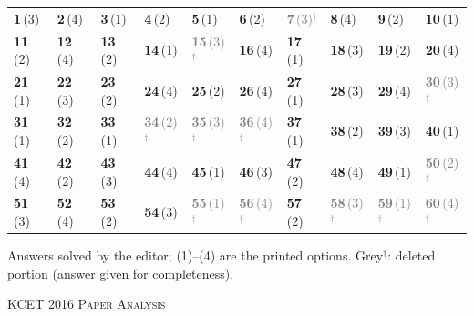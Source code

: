 {\small\setlength{\tabcolsep}{1pt}\renewcommand{\arraystretch}{1.5}
\begin{tabularx}{\linewidth}{@{}*{10}{>{\centering\arraybackslash}X}@{}}\toprule
\textbf{1}\,(3) & \textbf{2}\,(4) & \textbf{3}\,(1) & \textbf{4}\,(2) & \textbf{5}\,(1) & \textbf{6}\,(2) & \textcolor{gray}{\textbf{7}\,(3)$^{\dagger}$} & \textbf{8}\,(4) & \textbf{9}\,(2) & \textbf{10}\,(1)\\
\textbf{11}\,(2) & \textbf{12}\,(4) & \textbf{13}\,(2) & \textbf{14}\,(1) & \textcolor{gray}{\textbf{15}\,(3)$^{\dagger}$} & \textbf{16}\,(4) & \textbf{17}\,(1) & \textbf{18}\,(3) & \textbf{19}\,(2) & \textbf{20}\,(4)\\
\textbf{21}\,(1) & \textbf{22}\,(3) & \textbf{23}\,(2) & \textbf{24}\,(4) & \textbf{25}\,(2) & \textbf{26}\,(4) & \textbf{27}\,(1) & \textbf{28}\,(3) & \textbf{29}\,(4) & \textcolor{gray}{\textbf{30}\,(3)$^{\dagger}$}\\
\textbf{31}\,(1) & \textbf{32}\,(2) & \textbf{33}\,(1) & \textcolor{gray}{\textbf{34}\,(2)$^{\dagger}$} & \textcolor{gray}{\textbf{35}\,(3)$^{\dagger}$} & \textcolor{gray}{\textbf{36}\,(4)$^{\dagger}$} & \textbf{37}\,(1) & \textbf{38}\,(2) & \textbf{39}\,(3) & \textbf{40}\,(1)\\
\textbf{41}\,(4) & \textbf{42}\,(2) & \textbf{43}\,(3) & \textbf{44}\,(4) & \textbf{45}\,(1) & \textbf{46}\,(3) & \textbf{47}\,(2) & \textbf{48}\,(4) & \textbf{49}\,(1) & \textcolor{gray}{\textbf{50}\,(2)$^{\dagger}$}\\
\textbf{51}\,(3) & \textbf{52}\,(4) & \textbf{53}\,(2) & \textbf{54}\,(3) & \textcolor{gray}{\textbf{55}\,(1)$^{\dagger}$} & \textcolor{gray}{\textbf{56}\,(4)$^{\dagger}$} & \textbf{57}\,(2) & \textcolor{gray}{\textbf{58}\,(3)$^{\dagger}$} & \textcolor{gray}{\textbf{59}\,(1)$^{\dagger}$} & \textcolor{gray}{\textbf{60}\,(4)$^{\dagger}$}\\\bottomrule\end{tabularx}}\par\smallskip
{\footnotesize Answers solved by the editor; (1)--(4) are the printed options. {\color{gray}Grey$^{\dagger}$}: deleted portion (answer given for completeness).\par
}\par
\clearpage
\begin{center}{}\par
{\fontsize{20}{24}\selectfont\color{navy}\scshape KCET 2016 \textperiodcentered{} Paper Analysis}\par
{\color{gilt}}\end{center}

